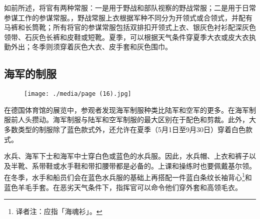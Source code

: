 如前所述，将官有两种常服：一是用于野战和部队视察的野战常服；二是用于日常参谋工作的参谋常服。，野战常服上衣根据军种不同分为开领式或合领式，并配有马裤和长筒靴；所有将官的参谋常服包括双排扣开领式上衣、银灰色衬衫配深灰色领带、石灰色长裤和皮鞋或短靴。夏季，可以根据天气条件穿夏季大衣或皮大衣执勤外出；冬季则须穿着灰色大衣、皮手套和灰色围巾。

\subsection{海军的制服}

\begin{figure}
\texttt{[image: ./media/page (16).jpg]}
\end{figure}

在德国体育馆的展览中，参观者发现海军制服种类比陆军和空军的更多。在海军制服前人头攒动。海军制服与陆军和空军制服的最大区别在于配色和剪裁。此外，大多数类型的制服除了蓝色款式外，还允许在夏季（5月1日至9月30日）穿着白色款式。

水兵、海军下士和海军中士穿白色或蓝色的水兵服。因此，水兵帽、上衣和裤子以及半靴、系带鞋或水手鞋和带扣腰带都是必备的。上课和操练时也要佩戴基尔领。在冬季，水手和船员们会在蓝色水兵服的基础上再搭配一件蓝白条纹长袖背心\footnote{译者注：应指「海魂衫」。}和蓝色羊毛手套。在恶劣天气条件下，指挥官可以命令他们穿外套和高领毛衣。

